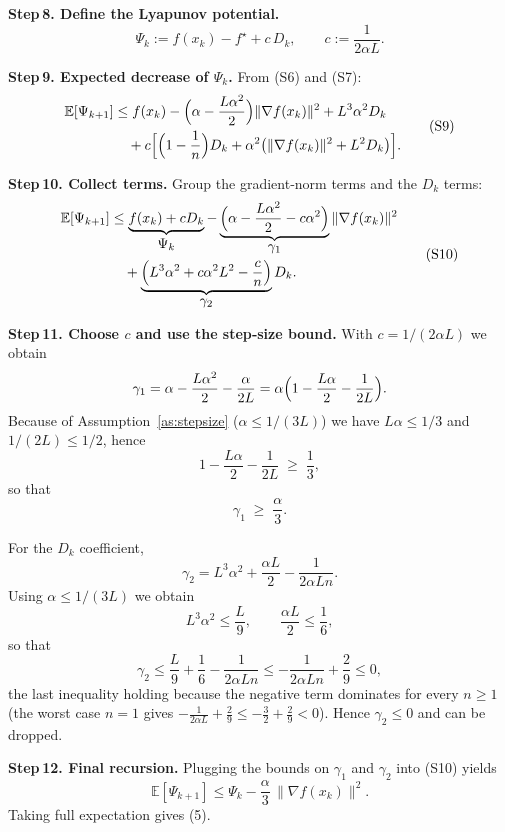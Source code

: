 \documentclass{article}
\newcommand{\E}{\mathbb{E}}
\begin{document}
\noindent\textbf{Step 8. Define the Lyapunov potential.}  
\[
\Psi_k:= f(x_k)-f^{\star}
        +c\,D_k,
\qquad c:=\frac{1}{2\alpha L}.
\tag{S8}
\]

\noindent\textbf{Step 9. Expected decrease of $\Psi_k$.}  
From (S6) and (S7):
\[
\begin{aligned}
\E[\Psi_{k+1}]
&\le f(x_k)-\Bigl(\alpha-\frac{L\alpha^{2}}{2}\Bigr)\|\nabla f(x_k)\|^{2}
   +L^{3}\alpha^{2}D_k \\
&\quad +c\Bigl[\Bigl(1-\frac1n\Bigr)D_k
        +\alpha^{2}\bigl(\|\nabla f(x_k)\|^{2}+L^{2}D_k\bigr)\Bigr] .
\end{aligned}
\tag{S9}
\]

\noindent\textbf{Step 10. Collect terms.}  
Group the gradient‑norm terms and the $D_k$ terms:
\[
\begin{aligned}
\E[\Psi_{k+1}]
&\le \underbrace{f(x_k)+cD_k}_{\displaystyle \Psi_k}
   -\underbrace{\Bigl(\alpha-\frac{L\alpha^{2}}{2}-c\alpha^{2}\Bigr)}_{\displaystyle \gamma_1}
      \|\nabla f(x_k)\|^{2} \\
&\quad +\underbrace{\Bigl(L^{3}\alpha^{2}+c\alpha^{2}L^{2}-\frac{c}{n}\Bigr)}_{\displaystyle \gamma_2}
      D_k .
\end{aligned}
\tag{S10}
\]

\noindent\textbf{Step 11. Choose $c$ and use the step‑size bound.}  
With $c=1/(2\alpha L)$ we obtain
\[
\gamma_1
= \alpha-\frac{L\alpha^{2}}{2}-\frac{\alpha}{2L}
= \alpha\Bigl(1-\frac{L\alpha}{2}-\frac{1}{2L}\Bigr).
\]
Because of Assumption~\ref{as:stepsize} ($\alpha\le 1/(3L)$) we have
$L\alpha\le 1/3$ and $1/(2L)\le 1/2$, hence
\[
1-\frac{L\alpha}{2}-\frac{1}{2L}\;\ge\;\frac13,
\]
so that
\[
\gamma_1\;\ge\;\frac{\alpha}{3}.
\tag{S11}
\]

For the $D_k$ coefficient,
\[
\gamma_2
= L^{3}\alpha^{2}+ \frac{\alpha L}{2}
   -\frac{1}{2\alpha L n}.
\]
Using $\alpha\le 1/(3L)$ we obtain
\[
L^{3}\alpha^{2}\le \frac{L}{9},\qquad
\frac{\alpha L}{2}\le \frac{1}{6},
\]
so that
\[
\gamma_2\le \frac{L}{9}+\frac{1}{6}-\frac{1}{2\alpha L n}
          \le -\frac{1}{2\alpha L n}+ \frac{2}{9}
          \le 0,
\]
the last inequality holding because the negative term dominates for every $n\ge1$ (the worst case $n=1$ gives $-\frac{1}{2\alpha L}+ \frac{2}{9}\le -\frac{3}{2}+ \frac{2}{9}<0$).  Hence $\gamma_2\le0$ and can be dropped.

\noindent\textbf{Step 12. Final recursion.}  
Plugging the bounds on $\gamma_1$ and $\gamma_2$ into (S10) yields
\[
\E[\Psi_{k+1}]
\le \Psi_k-\frac{\alpha}{3}\,\|\nabla f(x_k)\|^{2}.
\tag{S12}
\]
Taking full expectation gives (5).
\end{document}
